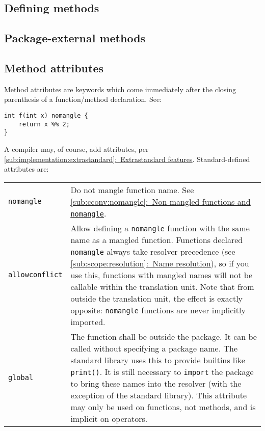 \documentclass{article}
\newcommand{\textref}[2]{\hyperref[#1]{\underline{\ref*{#1}:~#2}}}
\begin{document}
\subsection{Defining methods}
\label{sub:methods:definition}

\subsection{Package-external methods}
\label{sub:methods:extern}

\subsection{Method attributes}
\label{sub:methods:attributes}
Method attributes are keywords which come immediately after the closing
parenthesis of a function/method declaration. See:
\begin{verbatim}
int f(int x) nomangle {
    return x %% 2;
}
\end{verbatim}

A compiler may, of course, add attributes, per
\textref{sub:implementation:extrastandard}{Extrastandard features}.
Standard-defined attributes are:
\begin{center}
\begin{tabular}{|l|p{4in}|}
\hline
\texttt{nomangle} & Do not mangle function name. See
  \textref{sub:cconv:nomangle}{Non-mangled functions and \texttt{nomangle}}. \\
\texttt{allowconflict} & Allow defining a \texttt{nomangle} function with the
  same name as a mangled function.
  Functions declared
  \texttt{nomangle} always take resolver precedence (see
  \textref{sub:scope:resolution}{Name resolution}), so if you use this,
  functions with mangled names will not be callable within the translation
  unit. Note that from outside the translation unit, the effect is exactly
  opposite: \texttt{nomangle} functions are never implicitly imported. \\
\texttt{global} & The function shall be outside the package. It can be called
  without specifying a package name. The standard library uses this to provide
  builtins like \texttt{print()}. It is still necessary to \texttt{import} the
  package to bring these names into the resolver (with the exception of the
  standard library). This attribute may only be used on functions, not methods,
  and is implicit on operators. \\
\hline
\end{tabular}
\end{center}
\end{document}
